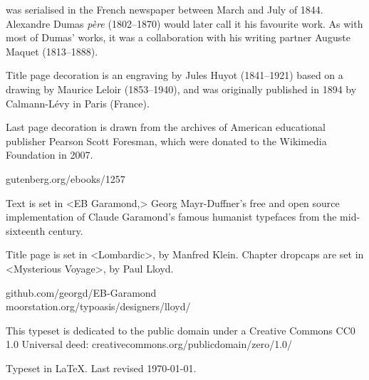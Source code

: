 \documentclass[
a5paper,
]{scrbook}
\begin{document}
\vfill
\begin{minipage}{\textwidth}
 was serialised in the French newspaper  between March and July of 1844. Alexandre Dumas \textit{père} (1802--1870) would later call it his favourite work. As with most of Dumas' works, it was a collaboration with his writing partner Auguste Maquet (1813--1888).

Title page decoration is an engraving by Jules Huyot (1841--1921) based on a drawing by Maurice Leloir (1853--1940), and was originally published in 1894 by Calmann-Lévy in Paris (France).

Last page decoration is drawn from the archives of American educational publisher Pearson Scott Foresman, which were donated to the Wikimedia Foundation in 2007.
\end{minipage}
\vfill
gutenberg.org/ebooks/1257
\vfill
\divider
\vfill
\begin{minipage}{\textwidth}
Text is set in <EB Garamond,> Georg Mayr-Duffner's free and open source implementation of Claude Garamond’s famous humanist typefaces from the mid-sixteenth century.

Title page is set in <Lombardic>, by Manfred Klein. Chapter dropcaps are set in <Mysterious Voyage>, by Paul Lloyd.
\end{minipage}
\vfill
github.com/georgd/EB-Garamond\\moorstation.org/typoasis/designers/lloyd/
\vfill
\divider
\vfill
\begin{minipage}{\textwidth}
This typeset is dedicated to the public domain under a Creative Commons CC0 1.0 Universal deed: creativecommons.org/publicdomain/zero/1.0/\\
\end{minipage}
\vfill
\divider
\vfill
Typeset in \LaTeX{}. Last revised \today.
\thispagestyle{empty}
\end{document}
